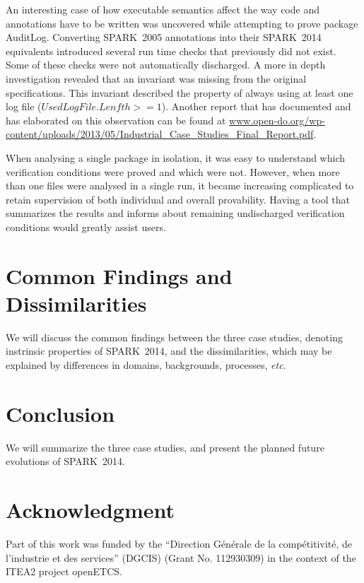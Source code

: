 \documentclass[10pt,a4paper,twocolumn]{article}
\newcommand{\openetcs}{openETCS\xspace}
\newcommand{\oldspark}{SPARK~2005\xspace}
\newcommand{\newspark}{SPARK~2014\xspace}
\newcommand{\etc}{\textit{etc.}\xspace}
\begin{document}
An interesting case of how executable semantics affect the way code
and annotations have to be written was uncovered while attempting to
prove package AuditLog. Converting \oldspark annotations into their
\newspark equivalents introduced several run time checks that
previously did not exist. Some of these checks were not automatically
discharged. A more in depth investigation revealed that an invariant
was missing from the original specifications. This invariant described
the property of always using at least one log file
($UsedLogFile.Lenfth >= 1$). Another report that has documented and
has elaborated on this observation can be found at
\url{www.open-do.org/wp-content/uploads/2013/05/Industrial_Case_Studies_Final_Report.pdf}.

When analysing a single package in isolation, it was easy to
understand which verification conditions were proved and which were
not. However, when more than one files were analysed in a single run,
it became increasing complicated to retain supervision of both
individual and overall provability. Having a tool that summarizes the
results and informs about remaining undischarged verification
conditions would greatly assist users.

\section{Common Findings and Dissimilarities}

We will discuss the common findings between the three case studies,
denoting instrinsic properties of \newspark, and the dissimilarities,
which may be explained by differences in domains, backgrounds,
processes, \etc

\section{Conclusion}

We will summarize the three case studies, and present the planned future
evolutions of \newspark.

\section{Acknowledgment}

Part of this work was funded by the ``Direction Générale de la
compétitivité, de l'industrie et des services'' (DGCIS) (Grant
No. 112930309) in the context of the ITEA2 project \openetcs.



\end{document}
